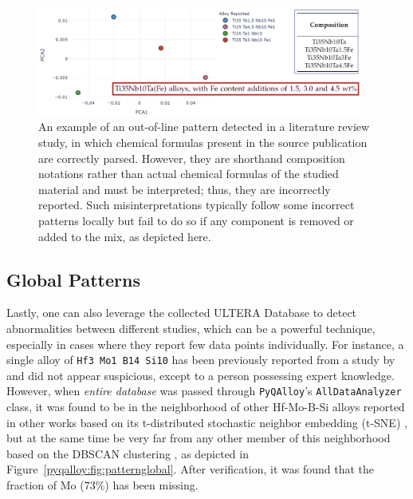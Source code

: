 \begin{figure}[H]
    \centering
    \includegraphics[width=0.95\textwidth]{pyqalloy/pyqalloy_CompositionNotation.png}
    \caption{An example of an out-of-line pattern detected in a literature review study, in which chemical formulas present in the source publication \cite{Amigo2019MechanicalApplications} are correctly parsed. However, they are shorthand composition notations rather than actual chemical formulas of the studied material and must be interpreted; thus, they are incorrectly reported. Such misinterpretations typically follow some incorrect patterns locally but fail to do so if any component is removed or added to the mix, as depicted here.}
    \label{pyqalloy:fig:patternbreak2}
\end{figure}


\subsection{Global Patterns} \label{pyqalloy:ssec:global}

Lastly, one can also leverage the collected ULTERA Database to detect abnormalities between different studies, which can be a powerful technique, especially in cases where they report few data points individually. For instance, a single alloy of \texttt{Hf3 Mo1 B14 Si10} has been previously reported from a study by \citet{Yu2012TensileTemperatures} and did not appear suspicious, except to a person possessing expert knowledge. However, when \emph{entire database} was passed through \texttt{PyQAlloy}'s \texttt{AllDataAnalyzer} class, it was found to be in the neighborhood of other Hf-Mo-B-Si alloys reported in other works based on its t-distributed stochastic neighbor embedding (t-SNE) \cite{HintonStochasticEmbedding}, but at the same time be very far from any other member of this neighborhood based on the DBSCAN clustering \cite{Ester1996ANoise}, as depicted in Figure~\ref{pyqalloy:fig:patternglobal}. After verification, it was found that the fraction of Mo ($73\%$) has been missing.

